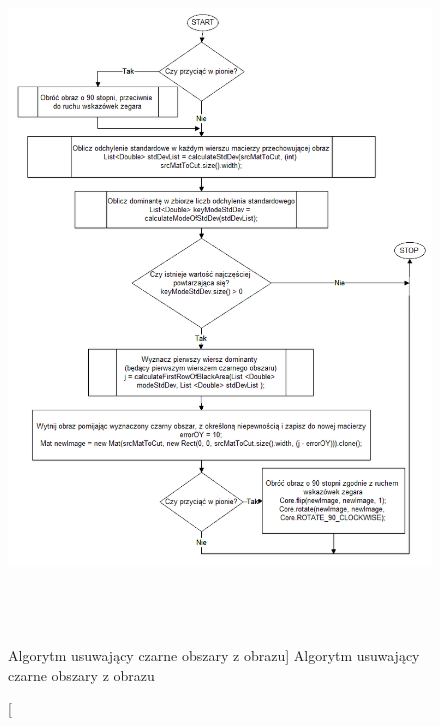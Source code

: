 \documentclass[a4paper,12pt]{article}
\begin{document}
    			\begin{figure}[!ht]  
    			    \begin{center}
    				    \includegraphics[height=18cm] {image//algorithm//cutBlackArea.png} 
    			    \end{center}
    			    \caption
        			[Algorytm usuwający czarne obszary z obrazu]  
    	    		{Algorytm usuwający czarne obszary z obrazu}  
    	    		\label{fig:cutBlack}
    		    \end{figure}
		    
		        \newpage
		    
\end{document}
